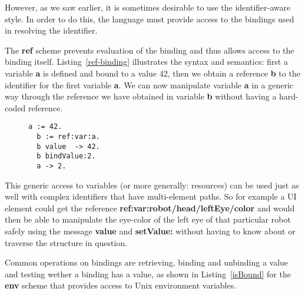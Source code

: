 \documentclass[preprint,authoryear]{acm_proc_article-sp}
\begin{document}
However, as we saw earlier, it is sometimes
desirable to use the identifier-aware style.  In order to do this, the language
must provide access to the bindings used in resolving the identifier.

The {\bf ref} scheme prevents evaluation of the binding and thus allows access
to the binding itself.  Listing~\ref{ref-binding} illustrates the syntax and semantics:
first a variable {\bf a} is defined and bound to a value 42, then we obtain a reference {\bf b} to
the identifier for the first variable {\bf a}.  We can now manipulate variable {\bf a} 
in a generic way through the reference we have obtained in variable {\bf b} without
having a hard-coded reference. 


\begin{figure}[htbp]
\begin{lstlisting}[style=L,label=ref-binding,caption=Accessing a variable via its binding.]
  a := 42.
  b := ref:var:a.
  b value  -> 42.
  b bindValue:2.
  a -> 2.
\end{lstlisting}
\end{figure}

This generic access to variables (or more generally: resources) can be used just as well
with complex identifiers that have multi-element paths.  So for example a UI element
could get the reference {\bf ref:var:robot/head/leftEye/color} and would then be
able to manipulate the eye-color of the left eye of that particular robot safely using
the message {\bf value} and {\bf setValue:}
without having to know about or traverse the structure in question.

Common operations on bindings are retrieving, binding and unbinding a value and testing 
wether a binding has a value, as shown in Listing~\ref{isBound} for the {\bf env} scheme
that provides access to Unix environment variables.

\end{document}
